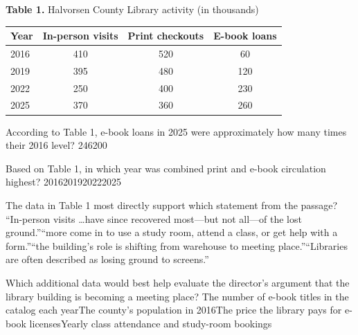 \documentclass[11pt]{article}
\begin{document}
\begin{center}
\small
\textbf{Table 1.} Halvorsen County Library activity (in thousands)\\[3pt]
\begin{tabular}{@{}lccc@{}}
\toprule
\textbf{Year} & \textbf{In-person visits} & \textbf{Print checkouts} & \textbf{E-book loans}\\
\midrule
2016 & 410 & 520 & \phantom{0}60\\
2019 & 395 & 480 & 120\\
2022 & 250 & 400 & 230\\
2025 & 370 & 360 & 260\\
\bottomrule
\end{tabular}
\end{center}

{According to Table 1, e-book loans in 2025 were approximately how many times their 2016 level?}
{2}{4}{6}{200}

{Based on Table 1, in which year was combined print and e-book circulation highest?}
{2016}{2019}{2022}{2025}

{The data in Table 1 most directly support which statement from the passage?}
{``In-person visits \dots have since recovered most---but not all---of the lost ground.''}{``more come in to use a study room, attend a class, or get help with a form.''}{``the building's role is shifting from warehouse to meeting place.''}{``Libraries are often described as losing ground to screens.''}

{Which additional data would best help evaluate the director's argument that the library building is becoming a meeting place?}
{The number of e-book titles in the catalog each year}{The county's population in 2016}{The price the library pays for e-book licenses}{Yearly class attendance and study-room bookings}
\end{document}
